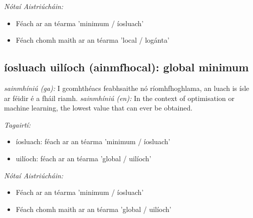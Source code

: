 \documentclass{article}
\begin{document}
 \noindent \textit{Nótaí Aistriúcháin:}
\begin{itemize}
	\item Féach ar an téarma 'minimum / íosluach'
	\item Féach chomh maith ar an téarma 'local / logánta'
\end{itemize}


\subsection*{íosluach uilíoch (ainmfhocal): global minimum} 
 \noindent \textit{sainmhíniú (ga):} I gcomhthéacs feabhsaithe nó ríomhfhoghlama, an luach is  ísle ar féidir é a fháil riamh.
\newline\newline
 \noindent \textit{sainmhíniú (en):} In the context of optimisation or machine learning, the lowest value that can ever be obtained.
\newline

 \noindent \textit{Tagairtí:}
\begin{itemize}
	\item íosluach: féach ar an téarma 'minimum / íosluach'
	\item uilíoch: féach ar an téarma 'global / uilíoch'
\end{itemize}

 \noindent \textit{Nótaí Aistriúcháin:}
\begin{itemize}
	\item Féach ar an téarma 'minimum / íosluach'
	\item Féach chomh maith ar an téarma 'global / uilíoch'
\end{itemize}



            \newpage
            \printbibliography[
                title={Tagairtí},
                heading=bibintoc
            ]
            
\end{document}
